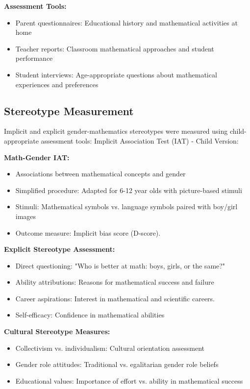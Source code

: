 \noindent
\textbf{Assessment Tools:}
\begin{itemize}
\item Parent questionnaires: Educational history and mathematical activities at home
\item Teacher reports: Classroom mathematical approaches and student performance
\item Student interviews: Age-appropriate questions about mathematical experiences and preferences
\end{itemize}


\subsection{Stereotype Measurement}
Implicit and explicit gender-mathematics stereotypes were measured using child-appropriate assessment tools:
Implicit Association Test (IAT) - Child Version:

\vspace{0.5\baselineskip}
\noindent
\textbf{Math-Gender IAT: }
\begin{itemize}
\item Associations between mathematical concepts and gender
\item Simplified procedure: Adapted for 6-12 year olds with picture-based stimuli
\item Stimuli: Mathematical symbols vs. language symbols paired with boy/girl images
\item Outcome measure: Implicit bias score (D-score).
\end{itemize}

\noindent
\textbf{Explicit Stereotype Assessment:}
\begin{itemize}
\item Direct questioning: "Who is better at math: boys, girls, or the same?"
\item Ability attributions: Reasons for mathematical success and failure
\item Career aspirations: Interest in mathematical and scientific careers.
\item Self-efficacy: Confidence in mathematical abilities
\end{itemize}

\noindent
\textbf{Cultural Stereotype Measures:}
\begin{itemize}
\item Collectivism vs. individualism: Cultural orientation assessment
\item Gender role attitudes: Traditional vs. egalitarian gender role beliefs
\item Educational values: Importance of effort vs. ability in mathematical success
\end{itemize}


